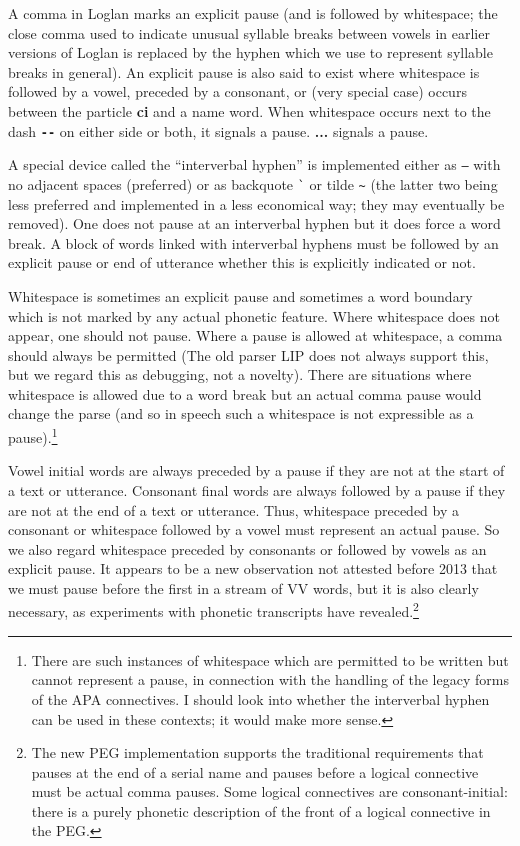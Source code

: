 \documentclass[12pt]{book}
\begin{document}
A comma in Loglan marks an explicit pause (and is followed by whitespace;  the close comma used to indicate unusual syllable breaks between vowels in earlier versions of Loglan is replaced by the hyphen which we use to represent syllable breaks in general).  An explicit pause is also said to exist where whitespace is followed by a vowel, preceded by a consonant, or (very special case) occurs between the particle {\bf ci} and a name word.  When whitespace occurs next to the dash {\bf \verb|--|} on either side or both, it signals a pause.  {\bf ...} signals a pause.

A special device called the ``interverbal hyphen'' is implemented either as {\tt --} with no adjacent spaces (preferred) or as backquote \verb |`|  or tilde \verb|~|  (the latter two being less preferred and implemented in a less economical way;  they may eventually be removed).  One does not pause at an interverbal hyphen but it does force a word break.  A block of words linked with interverbal hyphens must be followed by an explicit pause or end of utterance whether this is explicitly indicated or not.

Whitespace is sometimes an explicit pause and sometimes a word boundary which is not marked by any actual phonetic feature.  Where whitespace does not appear, one should not pause.  Where a pause is allowed at whitespace, a comma should always be permitted (The old parser LIP does not always support this, but we regard this as debugging, not a novelty).   There are situations where whitespace is allowed due to a word break but an actual comma pause would change the parse (and so in speech such a whitespace is not expressible as a pause).\footnote{There are such instances of whitespace which are permitted to be written but cannot represent a pause, in connection with the handling of the legacy forms of the APA connectives.  I should look into whether the interverbal hyphen can be used in these contexts;  it would make more sense.}

Vowel initial words are always preceded by a pause if they are not at the start of a text or utterance.  Consonant final words are always followed by a pause if they are not at the end of a text or utterance.  Thus, whitespace preceded by a consonant or whitespace followed by a vowel must represent an actual pause.  So we also regard whitespace preceded by consonants or followed by vowels
as an explicit pause.  It appears to be a new observation not attested before 2013  that we must pause before the first in a stream of VV words, but it is also clearly necessary, as experiments with phonetic transcripts have revealed.\footnote{The new PEG implementation supports the traditional requirements
that pauses at the end of a serial name and pauses before a logical connective must be actual comma pauses.  Some logical connectives are consonant-initial:  there is a purely phonetic description of the front of a logical connective in the PEG.}
\end{document}
